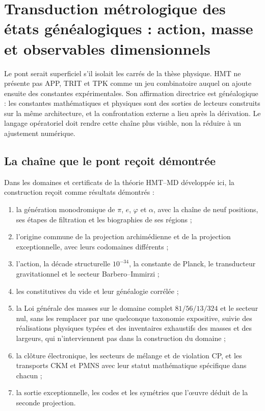 \section{Transduction métrologique des états généalogiques : action, masse et observables dimensionnels}
\label{gmc:chap:programa}

Le pont serait superficiel s'il isolait les carrés de la thèse physique. HMT
ne présente pas APP, TRIT et TPK comme un jeu combinatoire auquel on
ajoute ensuite des constantes expérimentales. Son affirmation directrice est généalogique : les
constantes mathématiques et physiques sont des sorties de lecteurs construits sur la
même architecture, et la confrontation externe a lieu après la dérivation.
Le langage opératoriel doit rendre cette chaîne plus visible, non la réduire à un
ajustement numérique.

\subsection{La chaîne que le pont reçoit démontrée}

Dans les domaines et certificats de la théorie HMT--MD développée ici,
la construction reçoit comme
résultats démontrés :

\begin{enumerate}
 \item la génération monodromique de $\pi$, $e$, $\varphi$ et $\alpha$, avec
 la chaîne de neuf positions, ses étapes de filtration et les biographies de
 ses régions ;
 \item l'origine commune de la projection archimédienne et de la projection
 exceptionnelle, avec leurs codomaines différents ;
 \item l'action, la décade structurelle $10^{-34}$, la constante de Planck,
 le transducteur gravitationnel et le secteur Barbero--Immirzi ;
 \item les constitutives du vide et leur généalogie corrélée ;
 \item la Loi générale des masses sur le domaine complet
 $81/56/13/324$ et le secteur nul, sans les remplacer par une quelconque taxonomie expositive, suivie des réalisations physiques
 typées et des inventaires exhaustifs des masses et des largeurs, qui
 n'interviennent pas dans la construction du domaine ;
 \item la clôture électronique, les secteurs de mélange et de violation CP, et
 les transports CKM et PMNS avec leur statut mathématique spécifique dans
 chacun ;
 \item la sortie exceptionnelle, les codes et les symétries que l'œuvre
 déduit de la seconde projection.
\end{enumerate}


